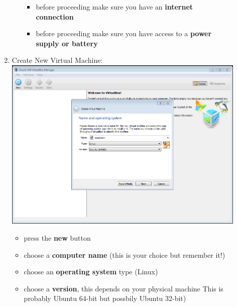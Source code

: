 \documentclass[12pt]{article}
\newcommand{\R}{\color{red}}
\newcommand{\B}{\color{blue}}
\begin{document}
\begin{description}
\begin{enumerate}
\begin{enumerate}
\begin{itemize}
                \item before proceeding make sure you have an {\bf \B internet connection }
                \item before proceeding make sure you have access to a {\bf \R power supply or battery }
                
            \end{itemize}
            
            \end{enumerate}
	\newpage
	\item Create New Virtual Machine: \vspace{20mm} \\
      		\hspace*{-2.5cm}\includegraphics[scale=.6]{Capture2.png}\\
               \begin{itemize}
                
	\item press the {\bf new} button
                \item choose a {\bf computer name} (this is your choice but remember it!)
                \item choose an {\bf operating system} type (Linux)
                \item choose a {\bf version}, this depends on your physical machine This is probably Ubuntu 64-bit but possbily Ubuntu 32-bit) 
                

\end{itemize}
\end{enumerate}
\end{description}
\end{document}
